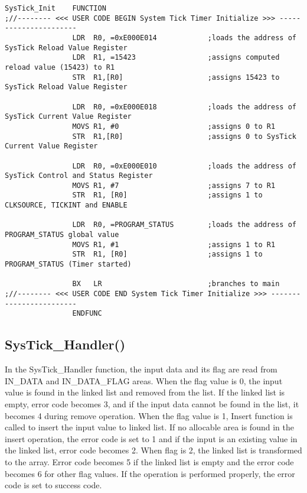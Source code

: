 \documentclass[pdftex,12pt,a4paper]{article}
\begin{document}
\begin{lstlisting}[caption=SysTick\_Init Function, style=customasm]
SysTick_Init	FUNCTION			
;//-------- <<< USER CODE BEGIN System Tick Timer Initialize >>> ----------------------	
                LDR	 R0, =0xE000E014			;loads the address of SysTick Reload Value Register
				LDR	 R1, =15423					;assigns computed reload value (15423) to R1
				STR	 R1,[R0]					;assigns 15423 to SysTick Reload Value Register

				LDR  R0, =0xE000E018			;loads the address of SysTick Current Value Register
				MOVS R1, #0						;assigns 0 to R1
				STR  R1,[R0]					;assigns 0 to SysTick Current Value Register
				
				LDR	 R0, =0xE000E010			;loads the address of SysTick Control and Status Register
				MOVS R1, #7						;assigns 7 to R1
				STR	 R1, [R0]					;assigns 1 to CLKSOURCE, TICKINT and ENABLE
				
				LDR	 R0, =PROGRAM_STATUS		;loads the address of PROGRAM_STATUS global value
				MOVS R1, #1						;assigns 1 to R1
				STR	 R1, [R0]					;assigns 1 to PROGRAM_STATUS (Timer started)
				
				BX	 LR							;branches to main
;//-------- <<< USER CODE END System Tick Timer Initialize >>> ------------------------				
				ENDFUNC
\end{lstlisting}

\subsection{SysTick\_Handler()}

In the SysTick\_Handler function, the input data and its flag are read from IN\_DATA and IN\_DATA\_FLAG areas. When the flag value is 0, the input value is found in the linked list and removed from the list. If the linked list is empty, error code becomes 3, and if the input data cannot be found in the list, it becomes 4 during remove operation. When the flag value is 1, Insert function is called to insert the input value to linked list. If no allocable area is found in the insert operation, the error code is set to 1 and if the input is an existing value in the linked list, error code becomes 2. When flag is 2, the linked list is transformed to the array. Error code becomes 5 if the linked list is empty and the error code becomes 6 for other flag values. If the operation is performed properly, the error code is set to success code. 
\end{document}
